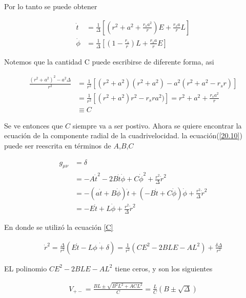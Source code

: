 \documentclass{article}
\begin{document}
Por lo tanto se puede obtener

\begin{align}
    \dot{t} &= \frac{1}{\Delta}  \left[\left(r^2+a^2+\frac{r_{s}a^2}{r}\right)E + \frac{r_{s}a}{r}L\right] \\
    \dot{\phi} &= \frac{1}{\Delta}  \left[\left(1-\frac{r_{s}}{r}\right)L + \frac{r_{s}a}{r}E\right]
\end{align}






Notemos que la cantidad C puede escribirse de diferente forma, asi

\begin{align}
    \frac{(r^2+a^2)^2-a^2\Delta}{r^2} &= \frac{1}{r^2}[(r^2+a^2)(r^2+a^2)-a^2(r^2+a^2-r_{s}r)]\\
    &= \frac{1}{r^2}[(r^2+a^2)r^2-r_{s}ra^2)] = r^2+a^2 +\frac{r_{s}a^2}{r}\\
    & \equiv C
    \label{C}
\end{align}

Se ve entonces que $C$ siempre va a ser postivo. Ahora se quiere encontrar la ecuación de la componente radial de la cuadrivelocidad. la ecuación(\ref{20.10}) puede ser reescrita en términos de $A$,$B$,$C$

\begin{align}
    g_{\mu\nu} &= \delta \\
    &= -A\dot{t}^2-2B\dot{t}\dot{\phi} +C\dot{\phi}^2 + \frac{r^2}{\Delta}\dot{r}^2\\
    &  = -(a\dot{t}+B\dot{\phi})\dot{t} + (-B\dot{t}+C\dot{\phi})\dot{\phi}+ \frac{r^2}{\Delta}\dot{r}^2\\
    & = -E\dot{t} + L\dot{\phi}+\frac{r^2}{\Delta}\dot{r}^2
\end{align}


En donde se utilizó la ecuación \ref{C}






\begin{align}
    \dot{r}^2 = \frac{\Delta}{r^2}(E\dot{t}-L\dot{\phi+\delta}) = \frac{1}{r^2}(CE^2 -2BLE -AL^2) +\frac{\delta \Delta}{r^2}
\end{align}



EL polinomio $CE^2 -2BLE -AL^2$ tiene ceros, y son los siguientes

\begin{align}
V_{+-} = \frac{BL \pm \sqrt{B^2L^2 +ACL^2}}{C} = \frac{L}{C}(B\pm \sqrt{\Delta})
\end{align}
\end{document}
